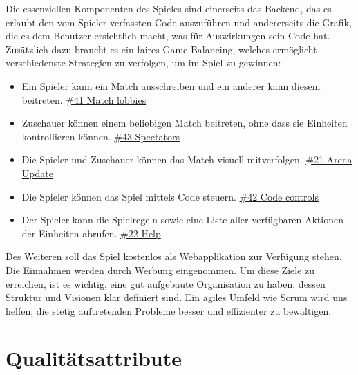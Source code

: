\documentclass[a4paper, 11pt]{scrartcl}
\let\oldsection\section
\renewcommand\section{\clearpage\oldsection}
\begin{document}
Die essenziellen Komponenten des Spieles sind einerseits das Backend, das es erlaubt den vom Spieler verfassten Code auszuführen und andererseits die Grafik, die es dem Benutzer ersichtlich macht, was für Auswirkungen sein Code hat. Zusätzlich dazu braucht es ein faires Game Balancing, welches ermöglicht verschiedenste Strategien zu verfolgen, um im Spiel zu gewinnen:

\begin{itemize}
  \item Ein Spieler kann ein Match ausschreiben und ein anderer kann diesem beitreten. \href{https://dev.azure.com/schaumic/darwin/_workitems/edit/41/}{\#41 Match lobbies}
  \item Zuschauer können einem beliebigen Match beitreten, ohne dass sie Einheiten kontrollieren können. \href{https://dev.azure.com/schaumic/darwin/_workitems/edit/43/}{\#43 Spectators}
  \item Die Spieler und Zuschauer können das Match visuell mitverfolgen. \href{https://dev.azure.com/schaumic/darwin/_workitems/edit/21/}{\#21 Arena Update}
  \item Die Spieler können das Spiel mittels Code steuern. \href{https://dev.azure.com/schaumic/darwin/_workitems/edit/42/}{\#42 Code controls}
  \item Der Spieler kann die Spielregeln sowie eine Liste aller verfügbaren Aktionen der Einheiten abrufen. \href{https://dev.azure.com/schaumic/darwin/_workitems/edit/22/}{\#22 Help}
\end{itemize}

Des Weiteren soll das Spiel kostenlos als Webapplikation zur Verfügung stehen. Die Einnahmen werden durch Werbung eingenommen.
Um diese Ziele zu erreichen, ist es wichtig, eine gut aufgebaute Organisation zu haben, dessen Struktur und Visionen klar definiert sind. Ein agiles Umfeld wie Scrum wird uns helfen, die stetig auftretenden Probleme
besser und effizienter zu bewältigen.

\section{Qualitätsattribute}
\end{document}
